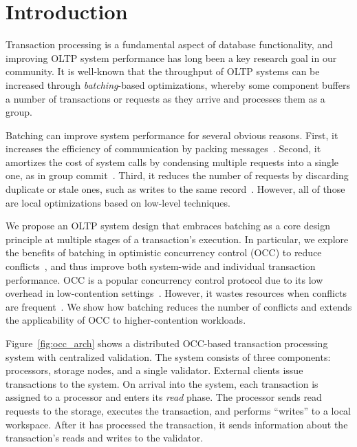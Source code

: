 \section{Introduction}\label{sec:intro}

Transaction processing is a fundamental aspect of database functionality, and improving OLTP system performance has long been a key research goal in our community. It is well-known that the throughput of OLTP systems can be increased through \emph{batching}-based optimizations, whereby some component buffers a number of transactions or requests as they arrive and processes them as a group.

Batching can improve system performance for several obvious reasons. First, it increases the efficiency of communication by packing messages~\cite{ding2015centiman,friedman1997packing}. Second, it amortizes the cost of system calls by condensing multiple requests into a single one, as in group commit~\cite{debrabant2013anti,hagmann1987reimplementing}. Third, it reduces the number of requests by discarding duplicate or stale ones, such as writes to the same record~\cite{faleiro2014lazy}. However, all of those are local optimizations based on low-level techniques.

We propose an OLTP system design that embraces batching as a core design principle at multiple stages of a transaction's execution. In particular, we explore the benefits of batching in optimistic concurrency control (OCC) to reduce conflicts~\cite{kung81tods}, and thus improve both system-wide and individual transaction performance. OCC is a popular concurrency control protocol due to its low overhead in low-contention settings~\cite{adya97podc, baker11cidr, bernstein2015optimizing,bernstein11cidr, bernstein11vldb, corbett12osdi,warp, patterson12vldb,peng10osdi}. However, it wastes resources when conflicts are frequent~\cite{agrawal1987concurrency}. We show how batching reduces the number of conflicts and extends the applicability of OCC to higher-contention workloads.


Figure~\ref{fig:occ_arch} shows a distributed OCC-based transaction processing system with centralized validation. The system consists of three components: processors, storage nodes, and a single validator. External clients issue transactions to the system. On arrival into the system, each transaction is assigned to a processor and enters its \emph{read} phase. The processor sends read requests to the storage, executes the transaction, and performs ``writes'' to a local workspace. After it has processed the transaction, it sends information about the transaction's reads and writes to the validator. 

